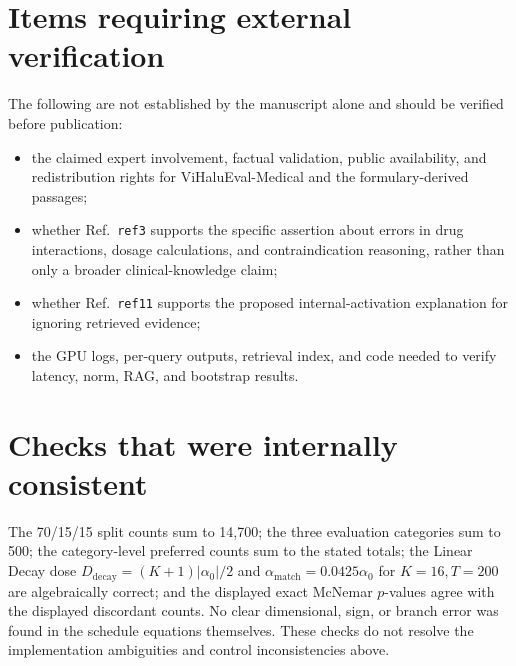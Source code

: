 \documentclass[11pt]{article}
\begin{document}
\section*{Items requiring external verification}

The following are not established by the manuscript alone and should be verified before publication:

\begin{itemize}
 \item the claimed expert involvement, factual validation, public availability, and redistribution rights for ViHaluEval-Medical and the formulary-derived passages;
 \item whether Ref.~\texttt{ref3} supports the specific assertion about errors in drug interactions, dosage calculations, and contraindication reasoning, rather than only a broader clinical-knowledge claim;
 \item whether Ref.~\texttt{ref11} supports the proposed internal-activation explanation for ignoring retrieved evidence;
 \item the GPU logs, per-query outputs, retrieval index, and code needed to verify latency, norm, RAG, and bootstrap results.
\end{itemize}

\section*{Checks that were internally consistent}

The 70/15/15 split counts sum to 14,700; the three evaluation categories sum to 500; the category-level preferred counts sum to the stated totals; the Linear Decay dose $D_{\mathrm{decay}}=(K+1)|\alpha_0|/2$ and $\alpha_{\mathrm{match}}=0.0425\alpha_0$ for $K=16,T=200$ are algebraically correct; and the displayed exact McNemar $p$-values agree with the displayed discordant counts.  No clear dimensional, sign, or branch error was found in the schedule equations themselves.  These checks do not resolve the implementation ambiguities and control inconsistencies above.
\end{document}
